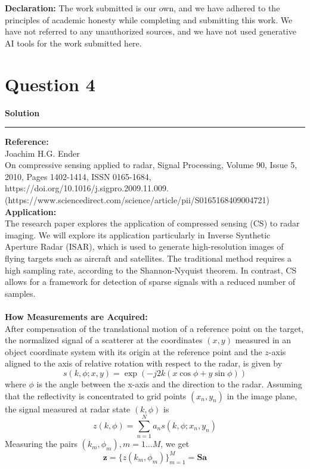 \documentclass[a4paper,12pt]{article}
\title{\cooltitle{CS754 Assignment-1}}
\author{{\bf Saksham Rathi, Ekansh Ravi Shankar, Kshitij Vaidya}}
\date{}
\newenvironment{solution}[2][]{%
    \begin{mdframed}[linecolor=blue!70!black, linewidth=2pt, roundcorner=10pt, backgroundcolor=yellow!10!white, skipabove=12pt, skipbelow=12pt]%
        \textbf{\large #2}
        \par\noindent\rule{\textwidth}{0.4pt}
}{
    \end{mdframed}
}
\begin{document}
\maketitle
\textbf{Declaration:} The work submitted is our own, and
we have adhered to the principles of academic honesty while completing and submitting this work. We have not
referred to any unauthorized sources, and we have not used generative AI tools for the work submitted here.
\section*{Question 4}

\begin{solution}{Solution}
\textbf{Reference: }\\
Joachim H.G. Ender\\
On compressive sensing applied to radar, Signal Processing, Volume 90, Issue 5, 2010, Pages 1402-1414,
ISSN 0165-1684, https://doi.org/10.1016/j.sigpro.2009.11.009.\\
(https://www.sciencedirect.com/science/article/pii/S0165168409004721)\\

\hspace{-19pt}\textbf{Application: }\\
The research paper explores the application of compressed sensing (CS) to radar imaging. We will explore its application particularly in Inverse Synthetic Aperture Radar (ISAR), which is used to generate high-resolution images of flying targets such as aircraft and satellites. The traditional method requires a high sampling rate, according to the Shannon-Nyquist theorem. In contrast, CS allows for a framework for detection of sparse signals with a reduced number of samples.\\
\\
\hspace{-19pt}\textbf{How Measurements are Acquired: }\\
After compensation of the translational motion of a
reference point on the target, the normalized signal of a scatterer at the coordinates $(x,y)$ measured in an object coordinate system with its origin at the reference point and the $z$-axis aligned to the axis of relative rotation with respect to the radar, is given by
\[
s(k,\phi;x,y) = \exp{(-j2k(x\cos{\phi}+y\sin{\phi}))}
\]
where $\phi$ is the angle between the x-axis and the direction to the radar. Assuming that the reflectivity is concentrated to grid points $(x_n,y_n)$ in the image plane, the signal measured at radar state $(k,\phi)$ is
\[
z(k,\phi) = \sum_{n=1}^N{a_ns(k,\phi;x_n,y_n)}
\]
Measuring the pairs $(k_m,\phi_m), m=1\dots M$, we get
\[
\textbf{z} = \{z(k_m,\phi_m)\}_{m=1}^M = \textbf{Sa}
\]
\\
\hbox{}
\\


\end{solution}
\end{document}
